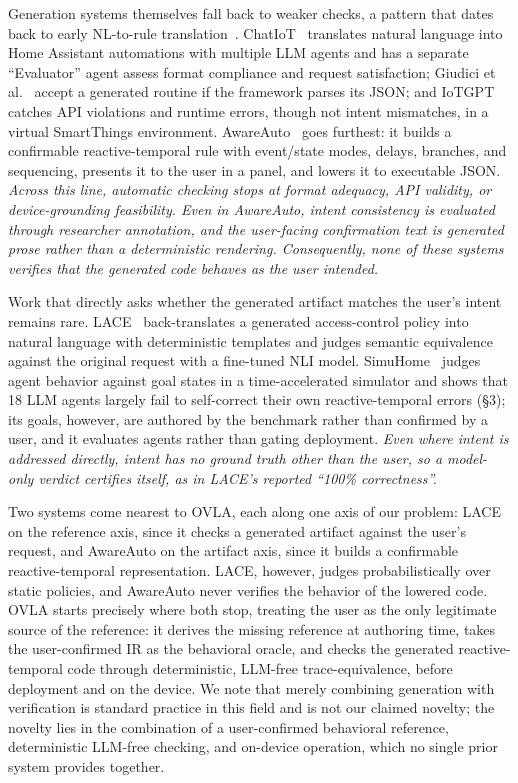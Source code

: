 \documentclass[sigconf,nonacm,anonymous,review]{acmart}
\begin{document}
Generation systems themselves fall back to weaker checks, a pattern that dates back to early NL-to-rule translation~\cite{quirk2015}. ChatIoT~\cite{chatiot} translates natural language into Home Assistant automations with multiple LLM agents and has a separate ``Evaluator'' agent assess format compliance and request satisfaction; Giudici et al.~\cite{giudici2025} accept a generated routine if the framework parses its JSON; and IoTGPT~\cite{iotgpt} catches API violations and runtime errors, though not intent mismatches, in a virtual SmartThings environment. AwareAuto~\cite{awareauto} goes furthest: it builds a confirmable reactive-temporal rule with event/state modes, delays, branches, and sequencing, presents it to the user in a panel, and lowers it to executable JSON. \emph{Across this line, automatic checking stops at format adequacy, API validity, or device-grounding feasibility. Even in AwareAuto, intent consistency is evaluated through researcher annotation, and the user-facing confirmation text is generated prose rather than a deterministic rendering. Consequently, none of these systems verifies that the generated code behaves as the user intended.}

Work that directly asks whether the generated artifact matches the user's intent remains rare. LACE~\cite{lace} back-translates a generated access-control policy into natural language with deterministic templates and judges semantic equivalence against the original request with a fine-tuned NLI model. SimuHome~\cite{simuhome} judges agent behavior against goal states in a time-accelerated simulator and shows that 18 LLM agents largely fail to self-correct their own reactive-temporal errors (\S3); its goals, however, are authored by the benchmark rather than confirmed by a user, and it evaluates agents rather than gating deployment. \emph{Even where intent is addressed directly, intent has no ground truth other than the user, so a model-only verdict certifies itself, as in LACE's reported ``100\% correctness''.}

Two systems come nearest to OVLA, each along one axis of our problem: LACE on the reference axis, since it checks a generated artifact against the user's request, and AwareAuto on the artifact axis, since it builds a confirmable reactive-temporal representation. LACE, however, judges probabilistically over static policies, and AwareAuto never verifies the behavior of the lowered code. OVLA starts precisely where both stop, treating the user as the only legitimate source of the reference: it derives the missing reference at authoring time, takes the user-confirmed IR as the behavioral oracle, and checks the generated reactive-temporal code through deterministic, LLM-free trace-equivalence, before deployment and on the device. We note that merely combining generation with verification is standard practice in this field and is not our claimed novelty; the novelty lies in the combination of a user-confirmed behavioral reference, deterministic LLM-free checking, and on-device operation, which no single prior system provides together.
\end{document}
